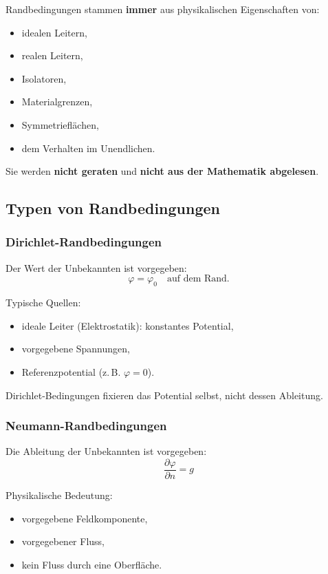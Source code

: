 \documentclass[a4paper]{article}
\newcommand{\imp}[1]{{\color{accent}\bfseries #1}}
\begin{document}
Randbedingungen stammen \imp{immer} aus physikalischen Eigenschaften von:
\begin{itemize}
  \item idealen Leitern,
  \item realen Leitern,
  \item Isolatoren,
  \item Materialgrenzen,
  \item Symmetrieflächen,
  \item dem Verhalten im Unendlichen.
\end{itemize}

Sie werden \imp{nicht geraten} und \imp{nicht aus der Mathematik abgelesen}.

\subsection{Typen von Randbedingungen}

\subsubsection{Dirichlet-Randbedingungen}

Der Wert der Unbekannten ist vorgegeben:
\[
\varphi = \varphi_0 \quad \text{auf dem Rand}.
\]

Typische Quellen:
\begin{itemize}
  \item ideale Leiter (Elektrostatik): konstantes Potential,
  \item vorgegebene Spannungen,
  \item Referenzpotential (z.\,B. $\varphi=0$).
\end{itemize}

\begin{merke}
Dirichlet-Bedingungen fixieren das Potential selbst,
nicht dessen Ableitung.
\end{merke}

\subsubsection{Neumann-Randbedingungen}

Die Ableitung der Unbekannten ist vorgegeben:
\[
\frac{\partial \varphi}{\partial n} = g
\]

Physikalische Bedeutung:
\begin{itemize}
  \item vorgegebene Feldkomponente,
  \item vorgegebener Fluss,
  \item kein Fluss durch eine Oberfläche.
\end{itemize}
\end{document}
